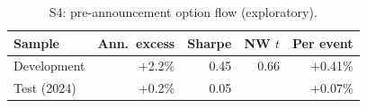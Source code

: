 \documentclass[../main.tex]{subfiles}
\begin{document}
\begin{table}[tbp]
\centering\small
\caption{S4: pre-announcement option flow (exploratory).}\label{tab:s4}
\begin{tabular}{@{}lrrrr@{}}
\toprule
Sample & Ann.\ excess & Sharpe & NW $t$ & Per event \\
\midrule
Development & $+$2.2\% & 0.45 & 0.66 & $+$0.41\% \\
Test (2024) & $+$0.2\% & 0.05 & & $+$0.07\% \\
\bottomrule
\end{tabular}
\end{table}
\end{document}
